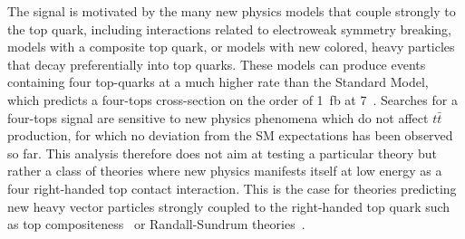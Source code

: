 The signal is motivated by the many new physics models that couple strongly to the top quark, including interactions related to electroweak symmetry breaking, models with a composite top quark, or models with new colored, heavy particles that decay preferentially into top quarks.
These models can produce events containing four top-quarks at a much higher rate than the Standard Model, which predicts a four-tops cross-section on the order of 1~fb at 7~\TeV.
Searches for a four-tops signal are sensitive to new physics phenomena which do not affect $t\bar{t}$ production, for which no deviation from the SM expectations has been observed so far.
This analysis therefore does not aim at testing a particular theory but rather a class of theories where new physics manifests itself at low energy as a four right-handed top contact interaction. 
This is the case for theories predicting new heavy vector particles strongly coupled to the right-handed top quark such as top compositeness~\cite{PhysRevD.78.074026,1126-6708-2008-04-087,1126-6708-2009-05-022} or Randall-Sundrum theories~\cite{Guchait:2007jd}.





